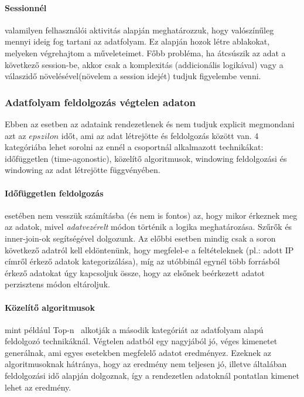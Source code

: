 \documentclass[a4paper,12pt]{article}
\begin{document}
\paragraph{Sessionnél}\hspace*{-0.4cm} valamilyen felhasználói aktivitás alapján meghatározzuk, hogy valószínűleg mennyi ideig fog tartani az adatfolyam. Ez alapján hozok létre ablakokat, melyeken végrehajtom a műveleteimet. Főbb probléma, ha átcsúszik az adat a következő session-be, akkor csak a komplexitás (addicionális logikával) vagy a válaszidő növelésével(növelem a session idejét) tudjuk figyelembe venni.

\subsubsection{Adatfolyam feldolgozás végtelen adaton}
Ebben az esetben az adataink rendezetlenek és nem tudjuk explicit megmondani azt az $epszilon$ időt, ami az adat létrejötte és feldolgozás között van. 4 kategóriába lehet sorolni az ennél a csoportnál alkalmazott technikákat: időfüggetlen (time-agonostic), közelítő algoritmusok, windowing feldolgozási és windowing az adat létrejötte függvényében. 

\paragraph{Időfüggetlen feldolgozás}\hspace*{-0.4cm} esetében nem vesszük számításba (és nem is fontos) az, hogy mikor érkeznek meg az adatok, mivel \textsl{adatvezérelt} módon történik a logika meghatározása. Szűrők és inner-join-ok segítségével dolgozunk. Az előbbi esetben mindig csak a soron következő adatról kell eldöntenünk, hogy megfelel-e a feltételeknek (pl.: adott IP címről érkező adatok kategorizálása), míg az utóbbinál egynél több forrásból érkező adatokat úgy kapcsoljuk össze, hogy az elsőnek beérkezett adatot perzisztens módon eltároljuk. 

\paragraph{Közelítő algoritmusok}\hspace*{-0.4cm} mint például Top-n~\cite{topn} alkotják a második kategóriát az adatfolyam alapú feldolgozó technikáknál. Végtelen adatból egy nagyjából jó, véges kimenetet generálnak, ami egyes esetekben megfelelő adatot eredményez. Ezeknek az algoritmusoknak hátránya, hogy az eredmény nem teljesen jó, illetve általában feldolgozási idő alapján dolgoznak, így a rendezetlen adatoknál pontatlan kimenet lehet az eredmény.
\end{document}
